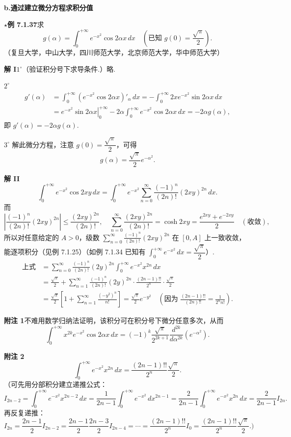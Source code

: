 \documentclass[UTF8,12pt,a4paper,fontset=fandol]{ctexart}
\begin{document}
\noindent\textbf{b.\quad 通过建立微分方程求积分值}

\noindent\textbf{$\star$例 7.1.37}\quad 求
\[
g(\alpha)=\int_0^{+\infty}e^{-x^2}\cos2\alpha x\,dx
\quad\left(\text{已知 }g(0)=\frac{\sqrt\pi}{2}\right).
\]
（复旦大学，中山大学，四川师范大学，北京师范大学，华中师范大学）

\noindent\textbf{解 I}\quad $1^\circ$（验证积分号下求导条件.）略.

$2^\circ$
\[
\begin{aligned}
g'(\alpha)
&=\int_0^{+\infty}(e^{-x^2}\cos2\alpha x)'_\alpha\,dx
=-\int_0^{+\infty}2xe^{-x^2}\sin2\alpha x\,dx\\
&=\left.e^{-x^2}\sin2\alpha x\right|_0^{+\infty}
-2\alpha\int_0^{+\infty}e^{-x^2}\cos2\alpha x\,dx
=-2\alpha g(\alpha),
\end{aligned}
\]
即 $g'(\alpha)=-2\alpha g(\alpha)$.

$3^\circ$ 解此微分方程，注意 $g(0)=\dfrac{\sqrt\pi}{2}$，可得
\[
g(\alpha)=\frac{\sqrt\pi}{2}e^{-\alpha^2}.
\]

\noindent\textbf{解 II}\quad
\[
\int_0^{+\infty}e^{-x^2}\cos2xy\,dx
=\int_0^{+\infty}e^{-x^2}\sum_{n=0}^{\infty}\frac{(-1)^n}{(2n)!}(2xy)^{2n}\,dx.
\]
而
\[
\left|\frac{(-1)^n}{(2n)!}(2xy)^{2n}\right|\le\frac{(2xy)^{2n}}{(2n)!},\quad
\sum_{n=0}^{\infty}\frac{(2xy)^{2n}}{(2n)!}=\cosh2xy=\frac{e^{2xy}+e^{-2xy}}2\quad(\text{收敛}),
\]
所以对任意给定的 $A>0$，级数 $\displaystyle\sum_{n=0}^{\infty}\frac{(-1)^n}{(2n)!}(2xy)^{2n}$ 在 $[0,A]$ 上一致收敛，能逐项积分（见例 7.1.25）（如例 7.1.34 已知有 $\displaystyle\int_0^{+\infty}e^{-x^2}\,dx=\dfrac{\sqrt\pi}{2}$）.
\[
\begin{aligned}
\text{上式}
&=\sum_{n=0}^{\infty}\frac{(-1)^n}{(2n)!}(2y)^{2n}
\int_0^{+\infty}e^{-x^2}x^{2n}\,dx\\
&=\frac{\sqrt\pi}{2}
+\sum_{n=1}^{\infty}\frac{(-1)^n}{(2n)!}(2y)^{2n}
\cdot\frac{(2n-1)!!}{2^n}\cdot\frac{\sqrt\pi}{2}\\
&=\frac{\sqrt\pi}{2}\left[1+\sum_{n=1}^{\infty}\frac{(-y^2)^n}{n!}\right]
=\frac{\sqrt\pi}{2}e^{-y^2}
\quad\left(\text{因为 }\frac{(2n-1)!!}{(2n)!!}=\frac1{2^n n!}\right).
\end{aligned}
\]

\noindent\textbf{附注 1}\quad 不难用数学归纳法证明，该积分可在积分号下微分任意多次，从而
\[
\int_0^{+\infty}x^{2k}e^{-x^2}\cos2\alpha x\,dx
=(-1)^k\frac{\sqrt\pi}{2^{2k+1}}\frac{d^{2k}}{d\alpha^{2k}}\left(e^{-\alpha^2}\right).
\]

\noindent\textbf{附注 2}\quad
\[
\int_0^{+\infty}e^{-x^2}x^{2n}\,dx
=\frac{(2n-1)!!}{2^n}\frac{\sqrt\pi}{2}.
\]
（可先用分部积分建立递推公式：
\[
I_{2n-2}=\int_0^{+\infty}e^{-x^2}x^{2n-2}\,dx
=\frac1{2n-1}\int_0^{+\infty}e^{-x^2}\,dx^{2n-1}
=\frac2{2n-1}\int_0^{+\infty}e^{-x^2}x^{2n}\,dx
=\frac2{2n-1}I_{2n}.
\]
再反复递推：
\[
I_{2n}=\frac{2n-1}{2}I_{2n-2}
=\frac{2n-1}{2}\frac{2n-3}{2}I_{2n-4}
=\cdots=\frac{(2n-1)!!}{2^n}I_0
=\frac{(2n-1)!!}{2^n}\frac{\sqrt\pi}{2}.)
\]
\end{document}
